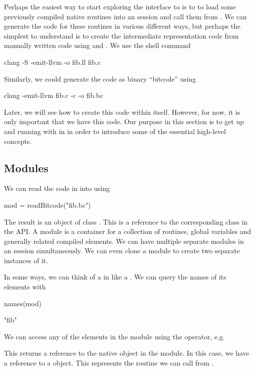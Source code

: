 \documentclass[article]{jss}
\def\IR{intermediate representation}
\begin{document}
Perhaps the easiest way to start exploring the \R{} interface to
\llvm{} is to to load some previously compiled native routines into an
\R{} session and call them from \R. 
We can generate the code for these routines in various different ways,
but perhaps the simplest to understand is to create the \IR{} code
from manually written \C{} code using \clang{} and
. We use the shell command
\begin{ShCode}
clang -S -emit-llvm -o fib.ll fib.c
\end{ShCode}
Similarly, we could generate the code as binary ``bitcode''
using
\begin{ShCode}
clang  -emit-llvm fib.c -c -o fib.bc
\end{ShCode}
Later, we will see how to create this code within \R{} itself.
However, for now, it is  only important that we have this code.
Our purpose in this section is to get up and running with \llvm{}
in \R{} in order to introduce some of the essential high-level concepts.


\subsection{Modules}
We can read the code in  into \R{} using
\begin{RCode}
mod = readBitcode("fib.bc")  
\end{RCode}
The result is an object of class .  This is a reference
to the corresponding \Cpp{} class in the \llvm{} API.  A module is a
container for a collection of routines, global variables and generally
related compiled elements.  We can have multiple separate modules in
an \R{} session simultaneously.  We can even clone a module to create
two separate instances of it.

In some ways, we can think of a  in \R{} like a .
We can query the names of its elements with 
\begin{RCode}
names(mod)
\end{RCode}
\begin{ROutput}
[1] "fib"  
\end{ROutput}

We can access any of the elements in the module using the
\Rdollar{} operator, e.g. 
This returns a reference to the native object in the \llvm{} module.
In this case, we have a reference to a  object.
This represents the routine we can call from \R.
\end{document}
